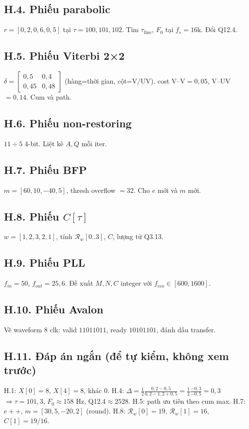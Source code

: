 \subsection*{H.4. Phiếu parabolic}
$r=[0{,}2,0{,}6,0{,}5]$ tại $\tau=100,101,102$. Tìm $\tau_{\mathrm{fine}}$, $F_0$ tại $f_s=16\text{k}$. Đổi Q12.4.

\subsection*{H.5. Phiếu Viterbi 2×2}
$\delta=\begin{bmatrix}0{,}5&0{,}4\\0{,}45&0{,}48\end{bmatrix}$ (hàng=thời gian, cột=V/UV). cost V--V$=0{,}05$, V--UV$=0{,}14$. Cum và path.

\subsection*{H.6. Phiếu non-restoring}
$11\div5$ 4-bit. Liệt kê $A,Q$ mỗi iter.

\subsection*{H.7. Phiếu BFP}
$m=[60,10,-40,5]$, thresh overflow $=32$. Cho $e$ mới và $m$ mới.

\subsection*{H.8. Phiếu $C[\tau]$}
$w=[1,2,3,2,1]$, tính $\mathcal{R}_w[0..3]$, $C$, lượng tử Q3.13.

\subsection*{H.9. Phiếu PLL}
$f_{in}=50$, $f_{out}=25{,}6$. Đề xuất $M,N,C$ integer với $f_{vco}\in[600,1600]$.

\subsection*{H.10. Phiếu Avalon}
Vẽ waveform 8 clk: valid $11011011$, ready $10101101$, đánh dấu transfer.

\subsection*{H.11. Đáp án ngắn (để tự kiểm, không xem trước)}
H.1: $X[0]=8$, $X[4]=8$, khác 0. H.4: $\Delta=\frac12\frac{0{,}2-0{,}5}{0{,}2-1{,}2+0{,}5}=\frac12\frac{-0{,}3}{-0{,}5}=0{,}3$ $\Rightarrow\tau=101{,}3$, $F_0\approx158\text{ Hz}$, Q12.4$\approx2528$. H.5: path ưu tiên theo cum max. H.7: $e{+}{+}$, $m=[30,5,-20,2]$ (round). H.8: $\mathcal{R}_w[0]=19$, $\mathcal{R}_w[1]=16$, $C[1]=19/16$. 

